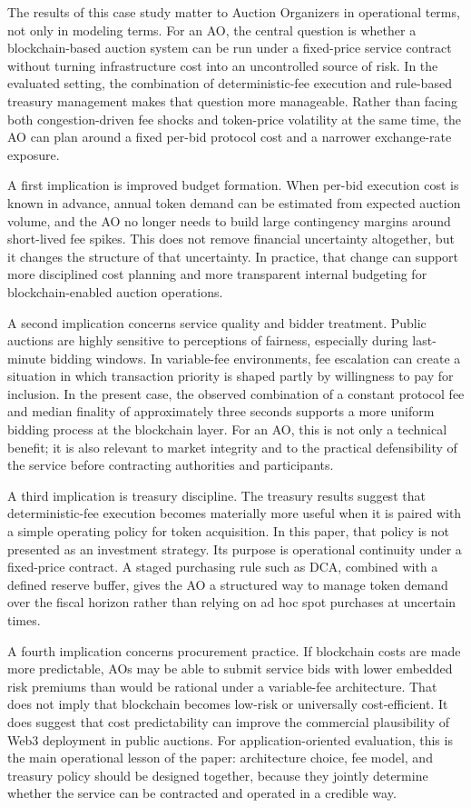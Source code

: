 \documentclass[runningheads]{llncs}
\begin{document}
The results of this case study matter to Auction Organizers in operational terms,
not only in modeling terms. For an AO, the central question is whether a
blockchain-based auction system can be run under a fixed-price service contract
without turning infrastructure cost into an uncontrolled source of risk. In the
evaluated setting, the combination of deterministic-fee execution and rule-based
treasury management makes that question more manageable. Rather than facing
both congestion-driven fee shocks and token-price volatility at the same time,
the AO can plan around a fixed per-bid protocol cost and a narrower exchange-rate
exposure.

A first implication is improved budget formation. When per-bid execution cost is
known in advance, annual token demand can be estimated from expected auction
volume, and the AO no longer needs to build large contingency margins around
short-lived fee spikes. This does not remove financial uncertainty altogether, but
it changes the structure of that uncertainty. In practice, that change can support
more disciplined cost planning and more transparent internal budgeting for
blockchain-enabled auction operations.

A second implication concerns service quality and bidder treatment. Public
auctions are highly sensitive to perceptions of fairness, especially during
last-minute bidding windows. In variable-fee environments, fee escalation can
create a situation in which transaction priority is shaped partly by willingness
to pay for inclusion. In the present case, the observed combination of a constant
protocol fee and median finality of approximately three seconds supports a more
uniform bidding process at the blockchain layer. For an AO, this is not only a
technical benefit; it is also relevant to market integrity and to the practical
defensibility of the service before contracting authorities and participants.

A third implication is treasury discipline. The treasury results suggest that
deterministic-fee execution becomes materially more useful when it is paired with
a simple operating policy for token acquisition. In this paper, that policy is not
presented as an investment strategy. Its purpose is operational continuity under
a fixed-price contract. A staged purchasing rule such as DCA, combined with a
defined reserve buffer, gives the AO a structured way to manage token demand
over the fiscal horizon rather than relying on ad hoc spot purchases at uncertain
times.

A fourth implication concerns procurement practice. If blockchain costs are made
more predictable, AOs may be able to submit service bids with lower embedded
risk premiums than would be rational under a variable-fee architecture. That does
not imply that blockchain becomes low-risk or universally cost-efficient. It does
suggest that cost predictability can improve the commercial plausibility of Web3
deployment in public auctions. For application-oriented evaluation, this is the
main operational lesson of the paper: architecture choice, fee model, and treasury
policy should be designed together, because they jointly determine whether the
service can be contracted and operated in a credible way.
\end{document}
